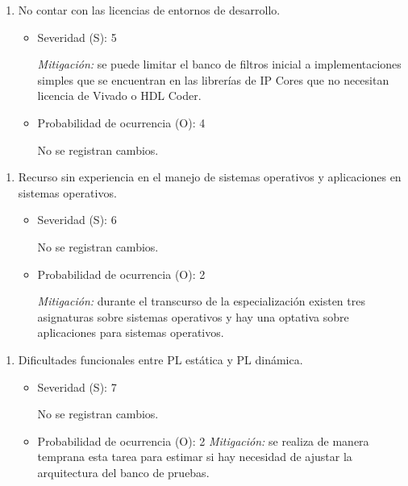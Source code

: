 \documentclass[
11pt, %
]{charter}
\begin{document}
\begin{enumerate}[]
	\begin{enumerate}[$\text{Riesgo}$ 3:, leftmargin=*,align=left]

		\item No contar con las licencias de entornos de desarrollo.
		\begin{itemize}
			\item Severidad (S): 5
			
			\emph{Mitigación:} se puede limitar el banco de filtros inicial a implementaciones simples que se encuentran en las librerías de IP Cores que no necesitan licencia de Vivado o HDL Coder.
			\item Probabilidad de ocurrencia (O): 4
			
			No se registran cambios.
		\end{itemize}
	\end{enumerate}

	\begin{enumerate}[$\text{Riesgo}$ 4:, leftmargin=*,align=left]

		\item Recurso sin experiencia en el manejo de sistemas operativos y aplicaciones en sistemas operativos.
		\begin{itemize}
			\item Severidad (S): 6
			
			No se registran cambios.
			\item Probabilidad de ocurrencia (O): 2
			
			\emph{Mitigación:} durante el transcurso de la especialización existen tres asignaturas sobre sistemas operativos y hay una optativa sobre aplicaciones para sistemas operativos.
		\end{itemize}
	\end{enumerate}

	\begin{enumerate}[$\text{Riesgo}$ 5:, leftmargin=*,align=left]

		\item Dificultades funcionales entre PL estática y PL dinámica.
		\begin{itemize}
			\item Severidad (S): 7
			
			No se registran cambios.
			\item Probabilidad de ocurrencia (O): 2
			\emph{Mitigación:} se realiza de manera temprana esta tarea para estimar si hay necesidad de ajustar la arquitectura del banco de pruebas.
			
		\end{itemize}
	\end{enumerate}


\end{enumerate}
\end{document}
